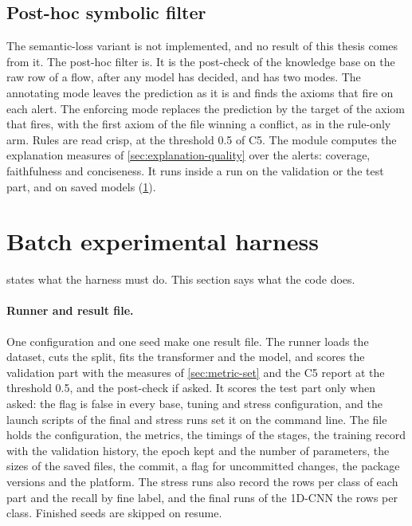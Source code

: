 \subsection{Post-hoc symbolic filter}
\label{sec:impl-controls}

The semantic-loss variant is not implemented, and no result of this thesis comes from it. The
post-hoc filter is. It is the post-check of the knowledge base on the raw row of a flow, after
any model has decided, and has two modes. The annotating mode leaves the prediction as it is and
finds the axioms that fire on each alert. The enforcing mode replaces the prediction by the
target of the axiom that fires, with the first axiom of the file winning a conflict, as in the
rule-only arm. Rules are read crisp, at the threshold 0.5 of C5. The module computes the
explanation measures of \cref{sec:explanation-quality} over the alerts: coverage, faithfulness
and conciseness. It runs inside a run on the validation or the test part, and on saved models
(\cref{sec:impl-harness}).

\section{Batch experimental harness}
\label{sec:impl-harness}

 states what the harness must do. This section says what the code does.

\paragraph{Runner and result file.}
One configuration and one seed make one result file. The runner loads the dataset, cuts the
split, fits the transformer and the model, and scores the validation part with the measures of
\cref{sec:metric-set} and the C5 report at the threshold 0.5, and the
post-check if asked. It scores the test part only when asked: the flag is false in every base,
tuning and stress configuration, and the launch scripts of the final and stress runs set it on
the command line. The file holds the configuration, the metrics, the timings of the stages, the
training record with the validation history, the epoch kept and the number of parameters, the
sizes of the saved files, the commit, a flag for uncommitted changes, the package versions and
the platform. The stress runs also record the rows per class of each part and the recall by fine
label, and the final runs of the 1D-CNN the rows per class. Finished seeds are skipped on resume.

